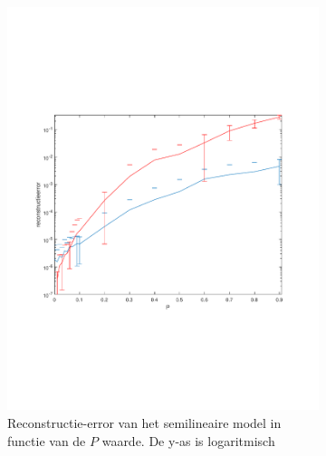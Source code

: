 \documentclass[12pt]{report}
\begin{document}
\begin{figure}
\begin{subfigure}[b]{0.5\textwidth}
\includegraphics[width=\textwidth,trim=0 200 0 175 cm]{PMC_10_100_Elog.pdf}
\caption{Reconstructie-error van het semilineaire model in functie van de $P$ waarde. De y-as is logaritmisch \label{fig:Elog} }
\end{subfigure}
\begin{subfigure}[b]{0.5\textwidth}

\end{subfigure}
\end{figure}
\end{document}
